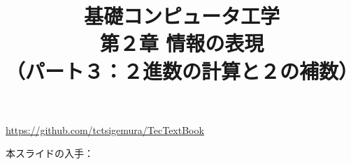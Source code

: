 \documentclass[handout]{beamer}        %
\begin{document}
\title{基礎コンピュータ工学\\第２章 情報の表現\\
       （パート３：２進数の計算と２の補数）}
\date{}

\begin{frame}
  \titlepage
  \centerline{\url{https://github.com/tctsigemura/TecTextBook}}
  \vfill
  \centerline{本スライドの入手：
    }
\end{frame}

\end{document}
